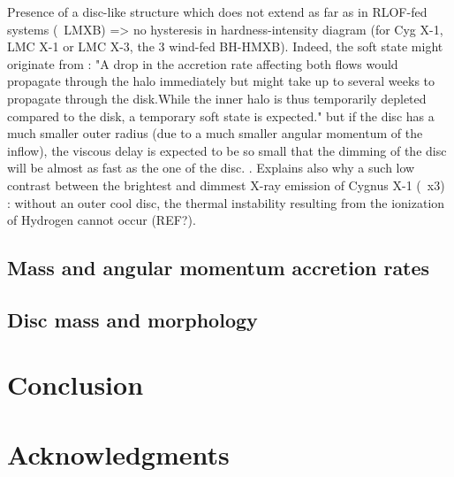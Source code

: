 \documentclass[a4paper,fleqn,usenatbib]{mnras}
\begin{document}
Presence of a disc-like structure which does not extend as far as in RLOF-fed systems (~LMXB) => no hysteresis in hardness-intensity diagram (for Cyg X-1, LMC X-1 or LMC X-3, the 3 wind-fed BH-HMXB). Indeed, the soft state might originate from : "A drop in the accretion rate affecting both flows would propagate through the halo immediately but might take up to several weeks to propagate through the disk.While the inner halo is thus temporarily depleted compared to the disk, a temporary soft state is expected." but if the disc has a much smaller outer radius (due to a much smaller angular momentum of the inflow), the viscous delay is expected to be so small that the dimming of the disc will be almost as fast as the one of the disc. \citep{Smith2002}. Explains also why a such low contrast between the brightest and dimmest X-ray emission of Cygnus X-1 (~x3) \citep{Grinberg:2014ux} : without an outer cool disc, the thermal instability resulting from the ionization of Hydrogen cannot occur (REF?).

\subsection{Mass and angular momentum accretion rates}
\label{sec:mdot_ldot}


\subsection{Disc mass and morphology}
\label{sec:disc}

\section{Conclusion}
\label{sec:conc}


\section*{Acknowledgments}

\end{document}
